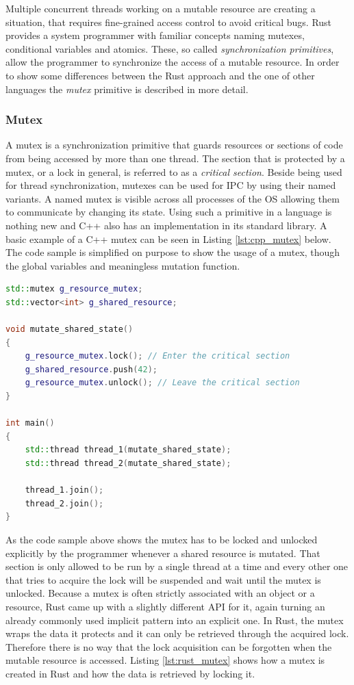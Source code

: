Multiple concurrent threads working on a mutable resource are creating a situation, that requires fine-grained access control to avoid critical bugs. Rust provides a system programmer with familiar concepts naming mutexes, conditional variables and atomics. These, so called \textit{synchronization primitives}, allow the programmer to synchronize the access of a mutable resource. In order to show some differences between the Rust approach and the one of other languages the \textit{mutex} primitive is described in more detail.

\subsubsection{Mutex}

A mutex is a synchronization primitive that guards resources or sections of code from being accessed by more than one thread. The section that is protected by a mutex, or a lock in general, is referred to as a \textit{critical section}. Beside being used for thread synchronization, mutexes can be used for \ac{IPC} by using their named variants. A named mutex is visible across all processes of the \ac{OS} allowing them to communicate by changing its state. Using such a primitive in a language is nothing new and C++ also has an implementation in its standard library. A basic example of a C++ mutex can be seen in Listing \ref{lst:cpp_mutex} below. The code sample is simplified on purpose to show the usage of a mutex, though the global variables and meaningless mutation function.\\

\begin{lstlisting}[caption={Usage of a std::mutex to guard a critical section in C++}, label={lst:cpp_mutex}, language=C++]
std::mutex g_resource_mutex;
std::vector<int> g_shared_resource;

void mutate_shared_state() 
{
	g_resource_mutex.lock(); // Enter the critical section
	g_shared_resource.push(42);
	g_resource_mutex.unlock(); // Leave the critical section
}

int main()
{
	std::thread thread_1(mutate_shared_state);
	std::thread thread_2(mutate_shared_state);
	
	thread_1.join();
	thread_2.join();
}
\end{lstlisting}

\noindent
As the code sample above shows the mutex has to be locked and unlocked explicitly by the programmer whenever a shared resource is mutated. That section is only allowed to be run by a single thread at a time and every other one that tries to acquire the lock will be suspended and wait until the mutex is unlocked. Because a mutex is often strictly associated with an object or a resource, Rust came up with a slightly different \ac{API} for it, again turning an already commonly used implicit pattern into an explicit one. In Rust, the mutex wraps the data it protects and it can only be retrieved through the acquired lock. Therefore there is no way that the lock acquisition can be forgotten when the mutable resource is accessed. Listing \ref{lst:rust_mutex} shows how a mutex is created in Rust and how the data is retrieved by locking it.\\

